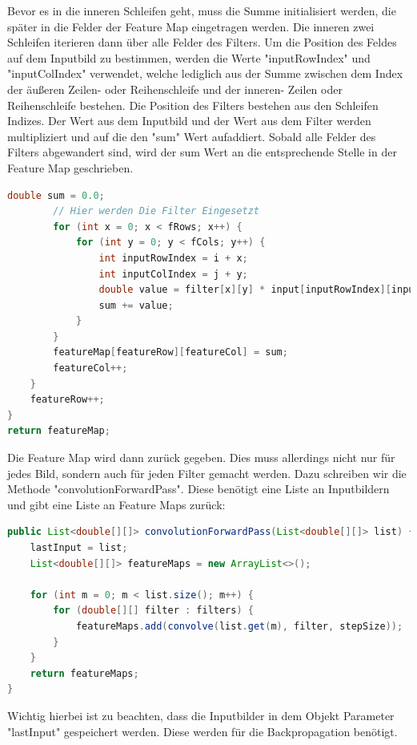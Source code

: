 \documentclass[12pt]{article}
\begin{document}
Bevor es in die inneren Schleifen geht, muss die Summe initialisiert werden, die später in die Felder der Feature Map eingetragen werden. Die inneren zwei Schleifen iterieren dann über alle Felder des Filters. Um die Position des Feldes auf dem Inputbild zu bestimmen, werden die Werte "inputRowIndex" und "inputColIndex" verwendet, welche lediglich aus der Summe zwischen dem Index der äußeren Zeilen- oder Reihenschleife und der inneren- Zeilen oder Reihenschleife bestehen. Die Position des Filters bestehen aus den Schleifen Indizes. Der Wert aus dem Inputbild und der Wert aus dem Filter werden multipliziert und auf die den "sum" Wert aufaddiert. Sobald alle Felder des Filters abgewandert sind, wird der sum Wert an die entsprechende Stelle in der Feature Map geschrieben.

\begin{lstlisting}[language=Java]
        double sum = 0.0;
        // Hier werden Die Filter Eingesetzt
        for (int x = 0; x < fRows; x++) {
            for (int y = 0; y < fCols; y++) {
                int inputRowIndex = i + x;
                int inputColIndex = j + y;
                double value = filter[x][y] * input[inputRowIndex][inputColIndex];
                sum += value;
            }
        }
        featureMap[featureRow][featureCol] = sum;
        featureCol++;
    }
    featureRow++;
}
return featureMap;  
\end{lstlisting}

Die Feature Map wird dann zurück gegeben. Dies muss allerdings nicht nur für jedes Bild, sondern auch für jeden Filter gemacht werden. Dazu schreiben wir die Methode "convolutionForwardPass". Diese benötigt eine Liste an Inputbildern und gibt eine Liste an Feature Maps zurück:

\begin{lstlisting}[language=Java]
public List<double[][]> convolutionForwardPass(List<double[][]> list) {
    lastInput = list;
    List<double[][]> featureMaps = new ArrayList<>();

    for (int m = 0; m < list.size(); m++) {
        for (double[][] filter : filters) {
            featureMaps.add(convolve(list.get(m), filter, stepSize));
        }
    }
    return featureMaps;
}
\end{lstlisting}

Wichtig hierbei ist zu beachten, dass die Inputbilder in dem Objekt Parameter "lastInput" gespeichert werden. Diese werden für die Backpropagation benötigt.
\end{document}
